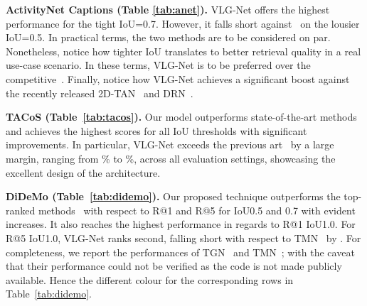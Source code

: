 \documentclass[10pt,twocolumn,letterpaper]{article}
\begin{document}
\noindent\textbf{ActivityNet Captions (Table \ref{tab:anet}).}
VLG-Net offers the highest performance for the tight IoU=0.7. However, it falls short against~\cite{liu2020jointly} on the lousier IoU=0.5. In practical terms, the two methods are to be considered on par. Nonetheless, notice how tighter IoU translates to better retrieval quality in a real use-case scenario. In these terms, VLG-Net is to be preferred over the competitive~\cite{liu2020jointly}. Finally, notice how VLG-Net achieves a significant boost against the recently released 2D-TAN~\cite{2DTAN_2020_AAAI} and DRN~\cite{Zeng_2020_CVPR}.

\noindent\textbf{TACoS (Table~\ref{tab:tacos}).}
Our model outperforms state-of-the-art methods and achieves the highest scores for all IoU thresholds with significant improvements. In particular, VLG-Net exceeds the previous art~\cite{liu2020jointly,Zeng_2020_CVPR,2DTAN_2020_AAAI} by a large margin, ranging from \% to \%, across all evaluation settings, showcasing the excellent design of the architecture. 

\noindent\textbf{DiDeMo (Table~\ref{tab:didemo}).  }
Our proposed technique outperforms the top-ranked methods~\cite{liu2020jointly,ACRN_SIGIR_18,10.1145/3240508.3240549} with respect to R@1 and R@5 for IoU0.5 and 0.7 with evident increases. It also reaches the highest performance in regards to R@1 IoU1.0. For R@5 IoU1.0, VLG-Net ranks second, falling short with respect to TMN~\cite{chen_etal_2018_temporally} by .
For completeness, we report the performances of TGN~\cite{Liu_2018_ECCV} and TMN~\cite{chen_etal_2018_temporally}; with the caveat that their performance could not be verified as the code is not made publicly available. Hence the different colour for the corresponding rows in Table~\ref{tab:didemo}.
\end{document}
